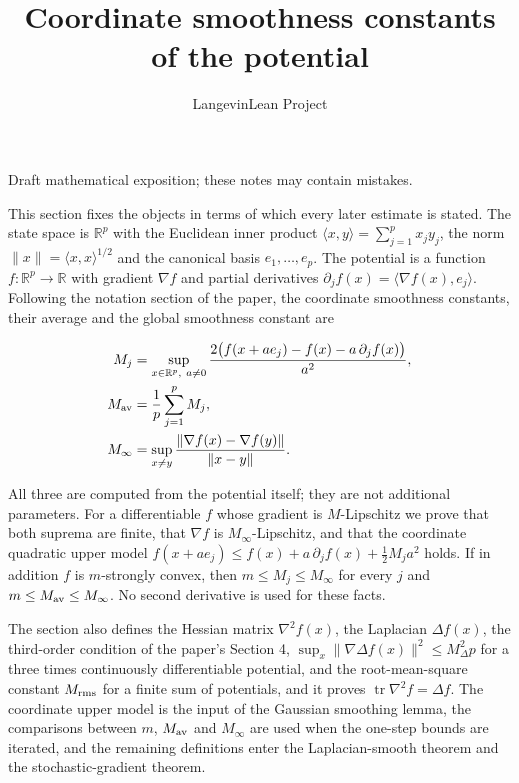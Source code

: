 \documentclass[11pt,a4paper]{article}
\title{\texorpdfstring{Coordinate smoothness constants of the potential}{Coordinate smoothness constants of the potential}}
\author{LangevinLean Project}
\date{}
\begin{document}
\maketitle
Draft mathematical exposition; these notes may contain mistakes.


This section fixes the objects in terms of which every later estimate is stated. The state space is \(\mathbb R^p\) with the Euclidean inner product \(\langle x,y\rangle=\sum_{j=1}^px_jy_j\), the norm \(\|x\|=\langle x,x\rangle^{1/2}\) and the canonical basis \(e_1,\dots,e_p\). The potential is a function \(f:\mathbb R^p\to\mathbb R\) with gradient \(\nabla f\) and partial derivatives \(\partial_jf(x)=\langle\nabla f(x),e_j\rangle\). Following the notation section of the paper, the coordinate smoothness constants, their average and the global smoothness constant are


\[\begin{aligned}
M_j&=\sup_{x\in\mathbb R^p,\ a\ne0}
\frac{2\bigl(f(x+ae_j)-f(x)-a\,\partial_jf(x)\bigr)}{a^2},\\
M_{\rm av}&=\frac1p\sum_{j=1}^pM_j,\\
M_\infty&=\sup_{x\ne y}
\frac{\|\nabla f(x)-\nabla f(y)\|}{\|x-y\|}.
\end{aligned}\]


All three are computed from the potential itself; they are not additional parameters. For a differentiable \(f\) whose gradient is \(M\)-Lipschitz we prove that both suprema are finite, that \(\nabla f\) is \(M_\infty\)-Lipschitz, and that the coordinate quadratic upper model \(f(x+ae_j)\le f(x)+a\,\partial_jf(x)+\tfrac12M_ja^2\) holds. If in addition \(f\) is \(m\)-strongly convex, then \(m\le M_j\le M_\infty\) for every \(j\) and \(m\le M_{\rm av}\le M_\infty\). No second derivative is used for these facts.




The section also defines the Hessian matrix \(\nabla^2f(x)\), the Laplacian \(\Delta f(x)\), the third-order condition of the paper's Section 4, \(\sup_x\|\nabla\Delta f(x)\|^2\le M_\Delta^2p\) for a three times continuously differentiable potential, and the root-mean-square constant \(M_{\rm rms}\) for a finite sum of potentials, and it proves \(\operatorname{tr}\nabla^2f=\Delta f\). The coordinate upper model is the input of the Gaussian smoothing lemma, the comparisons between \(m\), \(M_{\rm av}\) and \(M_\infty\) are used when the one-step bounds are iterated, and the remaining definitions enter the Laplacian-smooth theorem and the stochastic-gradient theorem.
\end{document}
